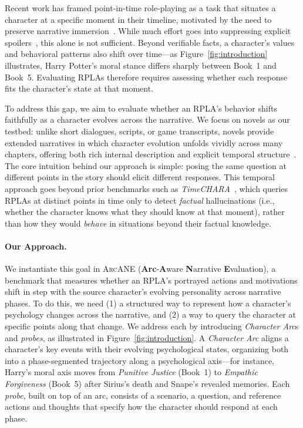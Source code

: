 \documentclass[11pt]{article}
\newcommand{\ours}{\textsc{ArcANE}}
\begin{document}
Recent work has framed point-in-time role-playing as a task that situates a character at a specific moment in their timeline, motivated by the need to preserve narrative immersion~\citep{Ryan:2008:ICIDS, Ryan:2003:Book, ahn-etal-2024-timechara}. While much effort goes into suppressing explicit spoilers~\cite{tu-etal-2024-charactereval, sadeq-etal-2024-mitigating}, this alone is not sufficient. Beyond verifiable facts, a character's values and behavioral patterns also shift over time---as Figure~\ref{fig:introduction} illustrates, Harry Potter's moral stance differs sharply between Book~1 and Book~5. Evaluating RPLAs therefore requires assessing whether each response fits the character's state at that moment.

To address this gap, we aim to evaluate whether an RPLA's behavior shifts faithfully as a character evolves across the narrative. We focus on novels as our testbed: unlike short dialogues, scripts, or game transcripts, novels provide extended narratives in which character evolution unfolds vividly across many chapters, offering both rich internal description and explicit temporal structure~\citep{wang2025coser}. The core intuition behind our approach is simple: posing the same question at different points in the story should elicit different responses. This temporal approach goes beyond prior benchmarks such as \emph{TimeCHARA}~\citep{ahn-etal-2024-timechara}, which queries RPLAs at distinct points in time only to detect \emph{factual} hallucinations (i.e., whether the character knows what they should know at that moment), rather than how they would \emph{behave} in situations beyond their factual knowledge.

\paragraph{Our Approach.}
We instantiate this goal in \ours{} (\textbf{Arc}-\textbf{A}ware \textbf{N}arrative \textbf{E}valuation), a benchmark that measures whether an RPLA's portrayed actions and motivations shift in step with the source character's evolving personality across narrative phases. To do this, we need (1) a structured way to represent how a character's psychology changes across the narrative, and (2) a way to query the character at specific points along that change. We address each by introducing \emph{Character Arc}s and \emph{probes}, as illustrated in Figure~\ref{fig:introduction}. A \emph{Character Arc} aligns a character's key events with their evolving psychological states, organizing both into a phase-segmented trajectory along a psychological axis---for instance, Harry's moral axis moves from \textit{Punitive Justice} (Book~1) to \textit{Empathic Forgiveness} (Book~5) after Sirius's death and Snape's revealed memories. Each \emph{probe}, built on top of an arc, consists of a scenario, a question, and reference actions and thoughts that specify how the character should respond at each phase.
\end{document}
